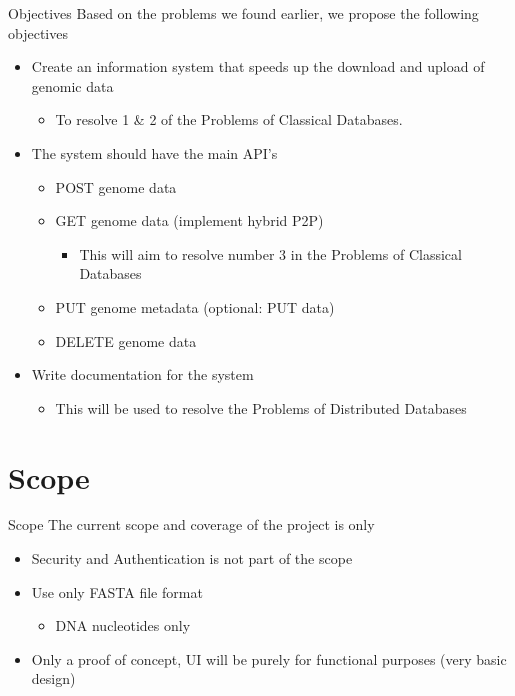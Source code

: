 \documentclass{beamer}
\begin{document}
\begin{frame}{Objectives}
Based on the problems we found earlier, we propose the following objectives
 \begin{itemize}
    \item Create an information system that speeds up the download and upload of genomic data
    \begin{itemize}
        \item To resolve 1 \& 2 of the Problems of Classical Databases. 
    \end{itemize}
\end{itemize}

\begin{itemize}
    \item The system should have the main API’s
    \begin{itemize}
        \item POST genome data
        \item GET genome data (implement hybrid P2P)
        \begin{itemize}
            \item This will aim to resolve number 3 in the Problems of Classical Databases
        \end{itemize}
        \item PUT genome metadata (optional: PUT data)
        \item DELETE genome data
    \end{itemize}
    \item Write documentation for the system
    \begin{itemize}
        \item This will be used to resolve the Problems of Distributed Databases
    \end{itemize}
\end{itemize}
\end{frame}

\section{Scope}
\begin{frame}{Scope}
The current scope and coverage of the project is only
\begin{itemize}
    \item Security and Authentication is not part of the scope
    \item Use only FASTA file format 
    \begin{itemize}
        \item DNA nucleotides only
    \end{itemize}
    \item Only a proof of concept, UI will be purely for functional purposes (very basic design)
\end{itemize}
\end{frame}
\end{document}
